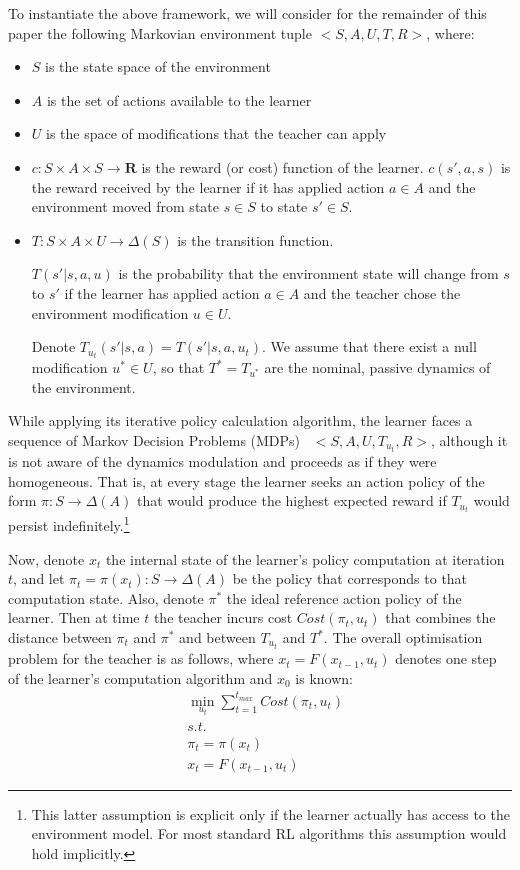 \documentclass[letterpaper]{aamas2009}
\begin{document}
To instantiate the above framework, we will consider for the remainder
of this paper the following Markovian environment tuple $<S,A,U,T,R>$,
where:
\begin{itemize}
\item $S$ is the state space of the environment
\item $A$ is the set of actions available to the learner
\item $U$ is the space of modifications that the teacher can apply
\item $c:S\times A\times S\rightarrow\mathbf{R}$ is the reward (or
  cost) function of the learner. $c(s',a,s)$ is the reward received by
  the learner if it has applied action $a\in A$ and the environment
  moved from state $s\in S$ to state $s'\in S$.
\item $T:S\times A\times U\rightarrow\Delta(S)$ is the transition
  function. 

$T(s'|s,a,u)$ is the probability that the
  environment state will change from $s$ to $s'$ if the learner has
  applied action $a\in A$ and the teacher chose the environment
  modification $u\in U$.

Denote $T_{u_t}(s'|s,a)=T(s'|s,a,u_t)$. We assume that there exist a null
  modification $u^*\in U$, so that $T^*=T_{u^*}$ are the nominal,
  passive dynamics of the environment.
\end{itemize}

While applying its iterative policy calculation algorithm, the learner
faces a sequence of Markov Decision Problems (MDPs)~\cite{puterman_book_94}
$<S,A,U,T_{u_t},R>$, although it is not aware of the dynamics
modulation and proceeds as if they were homogeneous. That is, at every
stage the learner seeks an action policy of the form
$\pi:S\rightarrow\Delta(A)$ that would produce the highest expected
reward if $T_{u_t}$ would persist indefinitely.\footnote{This latter
  assumption is explicit only if the learner actually has access to
  the environment model. For most standard RL algorithms this
  assumption would hold implicitly.}

Now, denote $x_t$ the internal state of the learner's policy
computation at iteration $t$, and let
$\pi_t=\pi(x_t):S\rightarrow\Delta(A)$ be the policy that corresponds
to that computation state. Also, denote $\pi^*$ the ideal reference
action policy of the learner. Then at time $t$ the teacher incurs cost
$Cost(\pi_t,u_t)$ that combines the distance between $\pi_t$ and
$\pi^*$ and between $T_{u_t}$ and $T^*$. The overall optimisation
problem for the teacher is as follows, where $x_t=F(x_{t-1},u_t)$
denotes one step of the learner's computation algorithm and $x_0$ is
known:
\begin{eqnarray*}
&\min\limits_{u_t}\sum\limits_{t=1}^{t_{max}}Cost(\pi_t,u_t)\\
&s.t.\\
&\pi_t=\pi(x_t)\\
&x_t=F(x_{t-1},u_t)
\end{eqnarray*}
\end{document}

